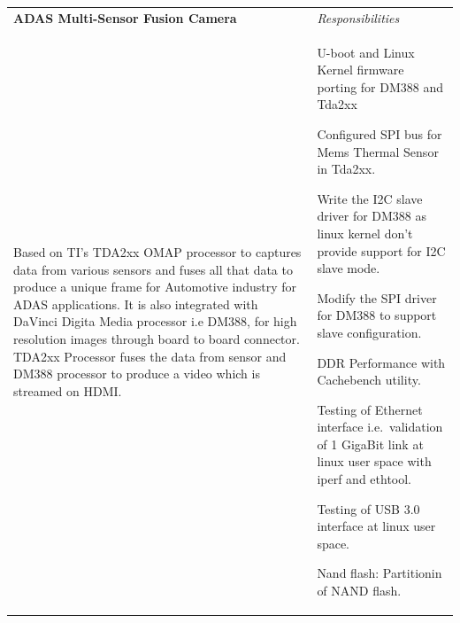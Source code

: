 \indent\begin{tabularx}{\textwidth}{p{} p{\RIGHTCOLUMNWIDTH}} %
    \textbf{ADAS Multi-Sensor Fusion Camera} & \emph{Responsibilities} \\%
	Based on TI's TDA2xx OMAP processor to captures data from various sensors and fuses all that data to produce a unique frame for Automotive industry for ADAS applications. It is also integrated with DaVinci Digita Media processor i.e DM388, for high resolution images through board to board connector. TDA2xx Processor fuses the data from sensor and DM388 processor to produce a video which is streamed on HDMI.
         &
        \vspace{-\topsep}\vspace{2pt} \begin{myitemize}
    \footnotesize {
          \item U-boot and Linux Kernel firmware porting for DM388 and Tda2xx
          \item Configured SPI bus for Mems Thermal Sensor in Tda2xx.
          \item Write the I2C slave driver for DM388 as linux kernel don’t provide support for I2C slave mode.
          \item Modify the SPI driver for DM388 to support slave configuration.
          \item DDR Performance with Cachebench utility.
          \item Testing of Ethernet interface i.e.\ validation of 1 GigaBit link at linux user space with iperf and ethtool.
          \item Testing of USB 3.0 interface at linux user space.
          \item Nand flash: Partitionin of NAND flash.
    }
   \end{myitemize}\vspace{-\topsep}%
\end{tabularx}
\endgroup
